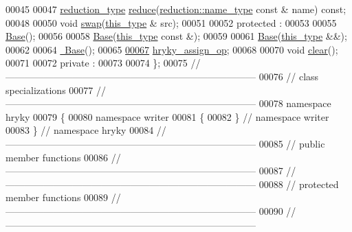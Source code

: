 \begin{DoxyCode}
00045 
00047     \hyperlink{classhryky_1_1_intrusive_ptr}{reduction_type} \hyperlink{classhryky_1_1writer_1_1_base_a2809ad5f75abd2266e6804e90094bc05}{reduce}(\hyperlink{classhryky_1_1reduction_1_1_string}{reduction::name_type} \textcolor{keyword}{const} & name) \textcolor{keyword}{const};
00048 
00050     \textcolor{keywordtype}{void} \hyperlink{classhryky_1_1writer_1_1_base_ab2b137d16fbe40d839ee136bd5304cab}{swap}(\hyperlink{classhryky_1_1writer_1_1_base}{this_type} & src);
00051 
00052 \textcolor{keyword}{protected} :
00053 
00055     \hyperlink{classhryky_1_1writer_1_1_base_a5ffe0568374d8b9b4c4ec32953fd6453}{Base}();
00056 
00058     \hyperlink{classhryky_1_1writer_1_1_base_a5ffe0568374d8b9b4c4ec32953fd6453}{Base}(\hyperlink{classhryky_1_1writer_1_1_base}{this_type} \textcolor{keyword}{const} &);
00059 
00061     \hyperlink{classhryky_1_1writer_1_1_base_a5ffe0568374d8b9b4c4ec32953fd6453}{Base}(\hyperlink{classhryky_1_1writer_1_1_base}{this_type} &&);
00062 
00064     \hyperlink{classhryky_1_1writer_1_1_base_a722da881b6c70cfcbde9243abcfbf334}{~Base}();
00065 
\hypertarget{writer__base_8h_source_l00067}{}\hyperlink{classhryky_1_1writer_1_1_base_a2c1b8ae994530c2c5e9d8f6f03f758aa}{00067}     \hyperlink{classhryky_1_1writer_1_1_base_a2c1b8ae994530c2c5e9d8f6f03f758aa}{hryky_assign_op};
00068 
00070     \textcolor{keywordtype}{void} \hyperlink{classhryky_1_1writer_1_1_base_a135bce05655e290c78fa83196199a576}{clear}();
00071 
00072 \textcolor{keyword}{private} :
00073 
00074 \};
00075 \textcolor{comment}{//
      ------------------------------------------------------------------------------}
00076 \textcolor{comment}{// class specializations}
00077 \textcolor{comment}{//
      ------------------------------------------------------------------------------}
00078 \textcolor{keyword}{namespace }hryky
00079 \{
00080 \textcolor{keyword}{namespace }writer
00081 \{
00082 \} \textcolor{comment}{// namespace writer}
00083 \} \textcolor{comment}{// namespace hryky}
00084 \textcolor{comment}{//
      ------------------------------------------------------------------------------}
00085 \textcolor{comment}{// public member functions}
00086 \textcolor{comment}{//
      ------------------------------------------------------------------------------}
00087 \textcolor{comment}{//
      ------------------------------------------------------------------------------}
00088 \textcolor{comment}{// protected member functions}
00089 \textcolor{comment}{//
      ------------------------------------------------------------------------------}
00090 \textcolor{comment}{//
      ------------------------------------------------------------------------------}

\end{DoxyCode}
